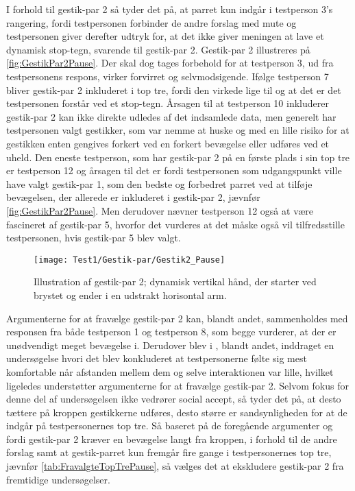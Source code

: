 \noindent
% 
I forhold til gestik-par 2 så tyder det på, at parret kun indgår i testperson 3's rangering, fordi testpersonen forbinder de andre forslag med mute og testpersonen giver derefter udtryk for, at det ikke giver meningen at lave et dynamisk stop-tegn, svarende til gestik-par 2. Gestik-par 2 illustreres på \autoref{fig:GestikPar2Pause}. Der skal dog tages forbehold for at testperson 3, ud fra testpersonens respons, virker forvirret og selvmodsigende. Ifølge testperson 7 bliver gestik-par 2 inkluderet i top tre, fordi den virkede lige til og at det er det testpersonen forstår ved et stop-tegn. Årsagen til at testperson 10 inkluderer gestik-par 2 kan ikke direkte udledes af det indsamlede data, men generelt har testpersonen valgt gestikker, som var nemme at huske og med en lille risiko for at gestikken enten gengives forkert ved en forkert bevægelse eller udføres ved et uheld. Den eneste testperson, som har gestik-par 2 på en første plads i sin top tre er testperson 12 og årsagen til det er fordi testpersonen som udgangspunkt ville have valgt gestik-par 1, som den bedste og forbedret parret ved at tilføje bevægelsen, der allerede er inkluderet i gestik-par 2, jævnfør \autoref{fig:GestikPar2Pause}. Men derudover nævner testperson 12 også at være fascineret af gestik-par 5, hvorfor det vurderes at det måske også vil tilfredsstille testpersonen, hvis gestik-par 5 blev valgt. 
%
\begin{figure}[H]
	\centering
	\texttt{[image: Test1/Gestik-par/Gestik2\_Pause]}
	\caption{Illustration af gestik-par 2; dynamisk vertikal hånd, der starter ved brystet og ender i en udstrakt horisontal arm.}
	\label{fig:GestikPar2Pause}
\end{figure}
\noindent
% 
Argumenterne for at fravælge gestik-par 2 kan, blandt andet, sammenholdes med responsen fra både testperson 1 og testperson 8, som begge vurderer, at der er unødvendigt meget bevægelse i. Derudover blev i , blandt andet, inddraget en undersøgelse hvori det blev konkluderet at testpersonerne følte sig mest komfortable når afstanden mellem dem og selve interaktionen var lille, hvilket ligeledes understøtter argumenterne for at fravælge gestik-par 2. Selvom fokus for denne del af undersøgelsen ikke vedrører social accept, så tyder det på, at desto tættere på kroppen gestikkerne udføres, desto større er sandsynligheden for at de indgår på testpersonernes top tre. Så baseret på de foregående argumenter og fordi gestik-par 2 kræver en bevægelse langt fra kroppen, i forhold til de andre forslag samt at gestik-parret kun fremgår fire gange i testpersonernes top tre, jævnfør \autoref{tab:FravalgteTopTrePause}, så vælges det at ekskludere gestik-par 2 fra fremtidige undersøgelser. 
%
